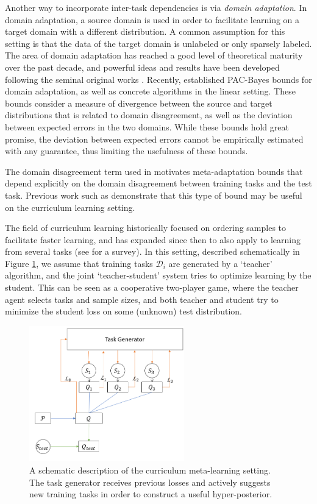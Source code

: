\documentclass{article}
\theoremstyle{definition}
\begin{document}
Another way to incorporate inter-task dependencies is via \emph{domain adaptation}. In domain adaptation, a source domain is used in order to facilitate learning on a target domain with a different distribution. A common assumption for this setting is that the data of the target domain is unlabeled or only sparsely labeled. 
The area of domain adaptation has reached a good level of theoretical maturity over the past
decade, and powerful ideas and results have been developed following the seminal original works \citep{Ben-David2010, Mansour2009}. Recently, \citet{Germain2020} established PAC-Bayes bounds for domain adaptation, as well as concrete algorithms in the linear setting. 
These bounds consider a measure of divergence between the source and target distributions that is related to domain disagreement, as well as the deviation between expected errors in the two domains. While these bounds hold great promise, the deviation between expected errors cannot be empirically estimated with any guarantee, thus limiting the usefulness of these bounds.

The domain disagreement term used in \citet{Germain2020} motivates meta-adaptation bounds that depend explicitly on the domain disagreement between training tasks and the test task. Previous work such as \citet{Pentina2015} demonstrate that this type of bound may be useful on the curriculum learning setting.

The field of curriculum learning \citep{Bengio2009} historically focused on ordering samples to facilitate faster learning, and has expanded since then to also apply to learning from several tasks (see \citet{Soviany2021} for a survey). In this setting, described schematically in Figure \ref{fig:cl-setting}, we assume that training tasks $\mathcal{D}_i$ are generated by a `teacher' algorithm, and the joint `teacher-student' system tries to optimize learning by the student. This can be seen as a cooperative two-player game, where the teacher agent selects tasks and sample sizes, and both teacher and student try to minimize the student loss on some (unknown) test distribution. 

\begin{figure}[t]
	\centering
	\includegraphics[width=0.6\textwidth]{setup_cl.PNG}
	\caption{A schematic description of the curriculum meta-learning setting. The task generator receives previous losses and actively suggests new training tasks in order to construct a useful hyper-posterior.}
	\label{fig:cl-setting}
\end{figure}
\end{document}
